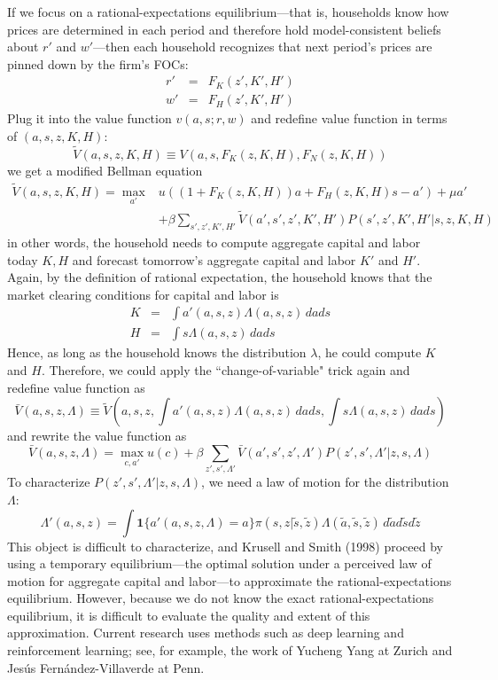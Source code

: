 \documentclass[12pt]{article}
\begin{document}
If we focus on a rational-expectations equilibrium---that is, households know how prices are determined in each period and therefore hold model-consistent beliefs about $r'$ and $w'$---then each household recognizes that next period's prices are pinned down by the firm's FOCs:
\begin{eqnarray}
	r' &=& F_K(z', K', H')\\
	w' &=& F_H(z', K', H')
\end{eqnarray}
Plug it into the value function $v(a,s;r,w)$ and redefine value function in terms of $(a,s,z,K,H)$:
\begin{equation}
	\tilde{V}(a,s,z, K,H) \equiv V(a,s, F_K(z,K,H), F_N(z,K,H))
\end{equation}
we get a modified Bellman equation
\begin{align}
	\tilde{V}(a,s,z,K,H) = \max_{a'} & u\left((1+F_K(z,K,H)) a + F_H(z,K,H)s - a'\right) + \mu a' \\ & + \beta \sum_{s',z', K', H'}\tilde{V}(a',s',z', K', H') P(s', z', K', H'|s,z, K,H)
\end{align}
in other words, the household needs to compute aggregate capital and labor today $K,H$ and forecast tomorrow's aggregate capital and labor $K'$ and $H'$. Again, by the definition of rational expectation, the household knows that the market clearing conditions for capital and labor is 
\begin{eqnarray}
	K &=& \int a'(a,s,z) \Lambda(a,s,z) \, dads \\
	H &=& \int s \Lambda(a,s,z) \, dads 
\end{eqnarray} 
Hence, as long as the household knows the distribution $\lambda$, he could compute $K$ and $H$. Therefore, we could apply the ``change-of-variable" trick again and redefine value function as
\begin{equation}
	\bar{V}(a,s,z,\Lambda) \equiv \tilde{V}\left(a,s,z,\int a'(a,s,z) \Lambda(a,s,z) \, dads, \int s \Lambda(a,s,z) \, dads\right)
\end{equation}
and rewrite the value function as 
\begin{equation}
	\bar{V}(a,s,z,\Lambda) = \max_{c,a'} u(c) + \beta \sum_{z',s',\Lambda'} \bar{V}(a',s',z',\Lambda') P(z',s',\Lambda'|z,s,\Lambda)
\end{equation}
To characterize $P(z',s',\Lambda'|z,s,\Lambda)$, we need a law of motion for the distribution $\Lambda$:
\begin{equation}
	\Lambda'(a,s,z) = \int \mathbf{1}\{a'(a,s,z,\Lambda) = a\} \pi(s,z|\tilde{s}, \tilde{z}) \Lambda(\tilde{a},\tilde{s},\tilde{z}) \,d\tilde{a} d \tilde{s} d \tilde{z} 
\end{equation}
 This object is difficult to characterize, and Krusell and Smith (1998) proceed by using a temporary equilibrium---the optimal solution under a perceived law of motion for aggregate capital and labor---to approximate the rational-expectations equilibrium. However, because we do not know the exact rational-expectations equilibrium, it is difficult to evaluate the quality and extent of this approximation. Current research uses methods such as deep learning and reinforcement learning; see, for example, the work of Yucheng Yang at Zurich and Jes\'us Fern\'andez-Villaverde at Penn.
\end{document}
